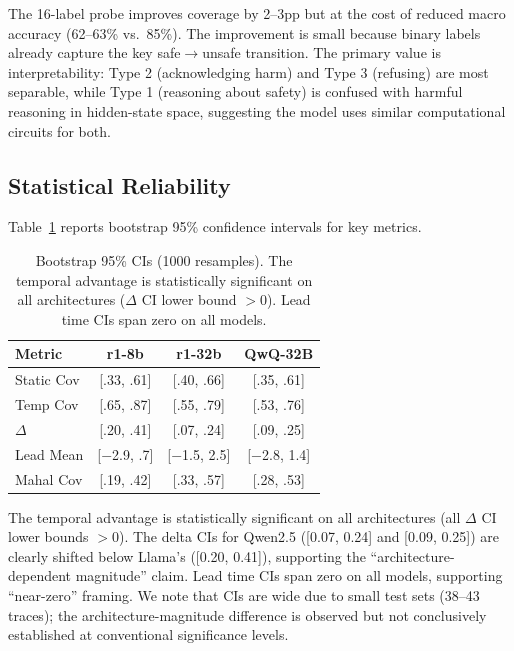 \documentclass[11pt,a4paper]{article}
\begin{document}
The 16-label probe improves coverage by 2--3pp but at the cost of reduced macro accuracy (62--63\% vs.\ 85\%). The improvement is small because binary labels already capture the key safe$\to$unsafe transition. The primary value is interpretability: Type 2 (acknowledging harm) and Type 3 (refusing) are most separable, while Type 1 (reasoning about safety) is confused with harmful reasoning in hidden-state space, suggesting the model uses similar computational circuits for both.

\subsection{Statistical Reliability}
\label{sec:bootstrap}

Table~\ref{tab:bootstrap} reports bootstrap 95\% confidence intervals for key metrics.

\begin{table}[t]
\centering
\small
\begin{tabular}{lccc}
\toprule
\textbf{Metric} & \textbf{r1-8b} & \textbf{r1-32b} & \textbf{QwQ-32B} \\
\midrule
Static Cov & [.33, .61] & [.40, .66] & [.35, .61] \\
Temp Cov & [.65, .87] & [.55, .79] & [.53, .76] \\
$\Delta$ & [.20, .41] & [.07, .24] & [.09, .25] \\
Lead Mean & [$-$2.9, .7] & [$-$1.5, 2.5] & [$-$2.8, 1.4] \\
Mahal Cov & [.19, .42] & [.33, .57] & [.28, .53] \\
\bottomrule
\end{tabular}
\caption{Bootstrap 95\% CIs (1000 resamples). The temporal advantage is statistically significant on all architectures ($\Delta$ CI lower bound $>0$). Lead time CIs span zero on all models.}
\label{tab:bootstrap}
\end{table}

The temporal advantage is statistically significant on all architectures (all $\Delta$ CI lower bounds $>0$). The delta CIs for Qwen2.5 ([0.07, 0.24] and [0.09, 0.25]) are clearly shifted below Llama's ([0.20, 0.41]), supporting the ``architecture-dependent magnitude'' claim. Lead time CIs span zero on all models, supporting ``near-zero'' framing. We note that CIs are wide due to small test sets (38--43 traces); the architecture-magnitude difference is observed but not conclusively established at conventional significance levels.

\end{document}
